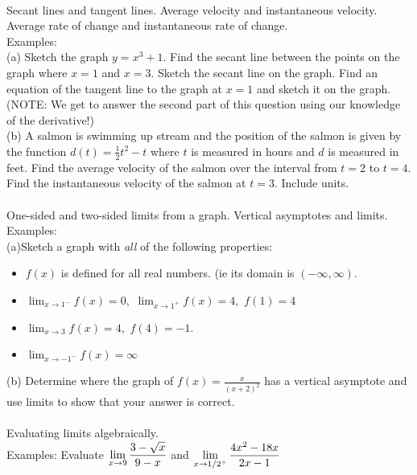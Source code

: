 \documentclass[11pt,fleqn]{article}
\begin{document}
\noindent {}\\
Secant lines and tangent lines. Average velocity and instantaneous velocity. Average rate of change and instantaneous rate of change.\\

\noindent Examples: \\
(a) Sketch the graph $y=x^3+1.$ Find the secant line between the points on the graph where $x=1$ and $x=3.$ Sketch the secant line on the graph. Find an equation of the tangent line to the graph at $x=1$ and sketch it on the graph. (NOTE: We get to answer the second part of this question using our knowledge of the derivative!) \\
(b) A salmon is swimming up stream and the position of the salmon is given by the function $d(t)=\frac{1}{2}t^2-t$ where $t$ is measured in hours and $d$ is measured in feet. Find the average velocity of the salmon over the interval from $t=2$ to $t=4.$ Find the instantaneous velocity of the salmon at $t=3.$ Include units.\\

\noindent {}\\
One-sided and two-sided limits from a graph. Vertical asymptotes and limits.\\

\noindent Examples: \\
(a)Sketch a graph with \emph{all} of the following properties: \\
\begin{itemize}
\item $f(x)$ is defined for all real numbers. (ie its domain is $(-\infty,\infty).$
\item $\lim_{x \to 1^-} f(x) = 0,$ $\lim_{x \to 1^+} f(x) =4,$ $f(1) =4$
\item $\lim_{x \to 3} f(x) =4,$ $f(4)=-1.$
\item $\lim_{x \to -1^-} f(x) =\infty$
\end{itemize}
(b) Determine where the graph of $f(x)=\frac{x}{(x+2)^2}$ has a vertical asymptote and use limits to show that your answer is correct. \\

\noindent {}\\
Evaluating limits algebraically.\\

\noindent Examples: Evaluate $\displaystyle \lim_{x \to 9} \frac{3-\sqrt{x}}{9-x}$ and $\displaystyle \lim_{x \to 1/2^+} \frac{4x^2-18x}{2x-1}$\\
\end{document}
